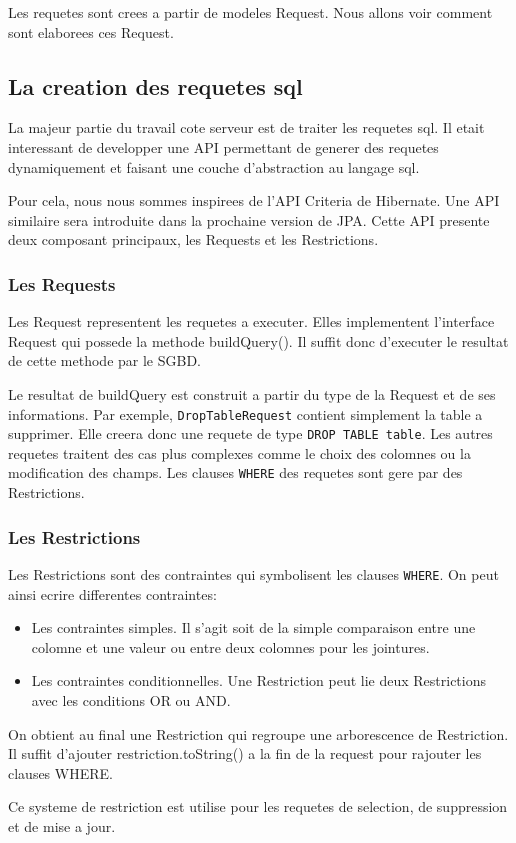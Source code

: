 Les requetes sont crees a partir de modeles Request. Nous allons voir comment sont elaborees ces Request.
\subsection{La creation des requetes sql}
La majeur partie du travail cote serveur est de traiter les requetes sql. Il etait interessant de developper une API permettant de generer des requetes dynamiquement et faisant une couche d'abstraction au langage sql.

Pour cela, nous nous sommes inspirees de l'API Criteria de Hibernate. Une API similaire sera introduite dans la prochaine version de JPA. Cette API presente deux composant principaux, les Requests et les Restrictions.
\subsubsection{Les Requests}
Les Request representent les requetes a executer. Elles implementent l'interface Request qui possede la methode buildQuery(). Il suffit donc d'executer le resultat de cette methode par le SGBD.

Le resultat de buildQuery est construit a partir du type de la Request et de ses informations. Par exemple, \texttt{DropTableRequest} contient simplement la table a supprimer. Elle creera donc une requete de type \texttt{DROP TABLE table}. Les autres requetes traitent des cas plus complexes comme le choix des colomnes ou la modification des champs. 
Les clauses \texttt{WHERE} des requetes sont gere par des Restrictions.
\subsubsection{Les Restrictions}
Les Restrictions sont des contraintes qui symbolisent les clauses \texttt{WHERE}. On peut ainsi ecrire differentes contraintes:
\begin{itemize}
 \item Les contraintes simples. Il s'agit soit de la simple comparaison entre une colomne et une valeur ou entre deux colomnes pour les jointures.
 \item Les contraintes conditionnelles. Une Restriction peut lie deux Restrictions avec les conditions OR ou AND.
\end{itemize}
On obtient au final une Restriction qui regroupe une arborescence de Restriction. Il suffit d'ajouter restriction.toString() a la fin de la request pour rajouter les clauses WHERE. 

Ce systeme de restriction est utilise pour les requetes de selection, de suppression et de mise a jour.
